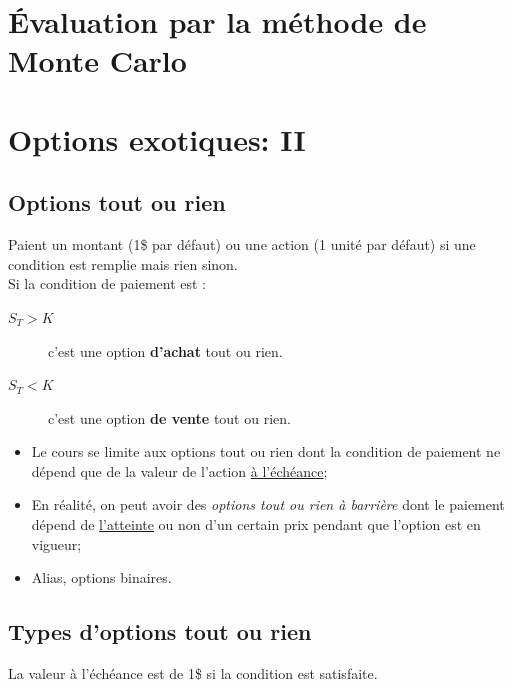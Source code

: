 \documentclass[10pt, french]{article}
\begin{document}
\begin{multicols*}{2}
\pagebreak
\section{Évaluation par la méthode de Monte Carlo}


\pagebreak
\setcounter{section}{22}
\section{Options exotiques: II}
\subsection*{Options tout ou rien}

\begin{definitionNOHFILL}
Paient un montant (1\$ par défaut) ou une action (1 unité par défaut) si une condition est remplie mais rien sinon.\\

Si la condition de paiement est :
\begin{description}
	\item[$S_{T}	>	K$] c'est une option \textbf{d'achat} tout ou rien.
	\item[$S_{T}	<	K$]	c'est une option \textbf{de vente} tout ou rien.
\end{description}

\tcbline

\begin{itemize}[leftmargin = *]
	\item	Le cours se limite aux options tout ou rien dont la condition de paiement ne dépend que de la valeur de l'action \underline{à l'échéance};
	\item	En réalité, on peut avoir des \textit{options tout ou rien à barrière} dont le paiement dépend de \underline{l'atteinte} ou non d'un certain prix pendant que l'option est en vigueur;
	\item	Alias, options binaires.
\end{itemize}
\end{definitionNOHFILL}


\subsection*{Types d'options tout ou rien}
\begin{definitionNOHFILLsub}
La valeur à l'échéance est de 1\$ si la condition est satisfaite.\\


\end{definitionNOHFILLsub}
\end{multicols*}
\end{document}
